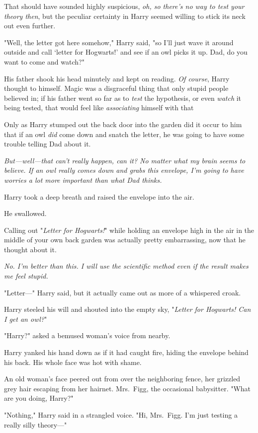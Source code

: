 That should have sounded highly suspicious, \emph{oh, so there's
no way to test your theory then}, but the peculiar
certainty in Harry seemed willing to stick its neck out even further.

"Well, the letter got here somehow," Harry said, "so I'll
just wave it around outside and call `letter for Hogwarts!'
and see if an owl picks it up. Dad, do you want to come and watch?"

His father shook his head minutely and kept on reading.
\emph{Of course}, Harry thought to himself. Magic was a
disgraceful thing that only stupid people believed in; if his
father went so far as to \emph{test} the hypothesis, or even
\emph{watch} it being tested, that would feel like \emph{associating}
himself with that{\el}

Only as Harry stumped out the back door into the garden
did it occur to him that if an owl \emph{did} come down and
snatch the letter, he was going to have some trouble
telling Dad about it.

\emph{But—well—that can't \emph{really} happen, can it? No matter
what my brain seems to believe. If an owl really comes
down and grabs this envelope, I'm going to have worries
a lot more important than what Dad thinks.}

Harry took a deep breath and raised the envelope into the air.

He swallowed.

Calling out "\emph{Letter for Hogwarts!}" while holding an envelope
high in the air in the middle of your own back garden
was{\el} actually pretty embarrassing, now that he thought
about it.

\emph{No. I'm better than this. I will use the scientific method
even if the result makes me feel stupid.}

"Letter—" Harry said, but it actually came out as more of a
whispered croak.

Harry steeled his will and shouted into the empty sky,
"\emph{Letter for Hogwarts! Can I get an owl?}"

"Harry?" asked a bemused woman's voice from nearby.

Harry yanked his hand down as if it had caught fire,
hiding the envelope behind his back. His whole face was hot with shame.

An old woman's face peered out from over the
neighboring fence, her grizzled grey hair escaping from her
hairnet. Mrs.~Figg, the occasional babysitter. "What are you
doing, Harry?"

"Nothing," Harry said in a strangled voice. "Hi, Mrs.~Figg.
I'm just{\el} testing a really silly theory—"

